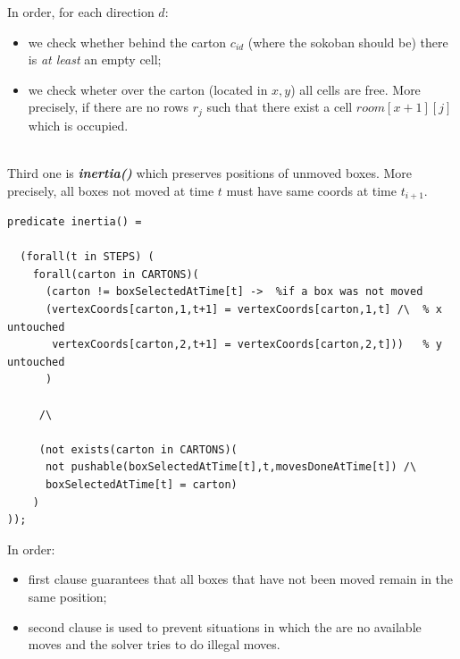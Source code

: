 \documentclass[headinclude, footinclude, abstract=on]{scrarticle}
\begin{document}
In order, for each direction $d$: \begin{itemize}
    \item we check whether behind the carton ${c}_{id}$ (where the sokoban should be) there is \textit{at least} an empty cell; 
    \item we check wheter over the carton (located in $x,y$) all cells are free. More precisely, if there are no rows $r_j$ such that there exist a cell $room[x+1][j]$ which is occupied.
\end{itemize}

\\Third one is \textbf{\textit{inertia()}} which preserves positions of unmoved boxes. More precisely, all boxes not moved at time $t$ must have same coords at time ${t}_{i+1}$. 
\begin{verbatim}
predicate inertia() = 

  (forall(t in STEPS) (
    forall(carton in CARTONS)(
      (carton != boxSelectedAtTime[t] ->  %if a box was not moved
      (vertexCoords[carton,1,t+1] = vertexCoords[carton,1,t] /\  % x untouched
       vertexCoords[carton,2,t+1] = vertexCoords[carton,2,t]))   % y untouched
      )
          
     /\
     
     (not exists(carton in CARTONS)(
      not pushable(boxSelectedAtTime[t],t,movesDoneAtTime[t]) /\ 
      boxSelectedAtTime[t] = carton)
    )
));
\end{verbatim}
In order:
\begin{itemize}
    \item first clause guarantees that all boxes that have not been moved remain in the same position;
    \item second clause is used to prevent situations in which the are no available moves and the solver tries to do illegal moves.
\end{itemize}
\end{document}
